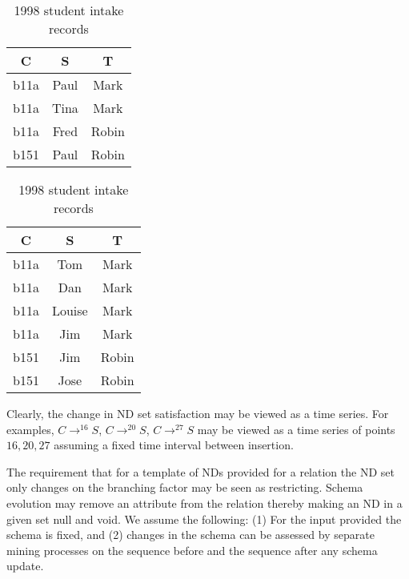 {\line
\begin{table}[ht]
\begin{minipage}[b]{8cm}
\begin{center}
\begin{tabular}{|c|c|c|} \hline
 C & S & T \\ \hline
 b11a & Paul & Mark \\ 
 b11a & Tina & Mark \\
 b11a & Fred & Robin \\
 b151 & Paul & Robin \\ \hline
\end{tabular}
\end{center}
\caption{\label{tab:1} 1997 student intake records}
\end{minipage}
\hfill
\begin{minipage}[b]{8cm}
\begin{center}
\begin{tabular}{|c|c|c|} \hline
 C & S & T \\ \hline
 b11a & Tom & Mark \\
 b11a & Dan & Mark \\
 b11a & Louise & Mark \\
 b11a & Jim & Mark \\
 b151 & Jim & Robin \\ 
 b151 & Jose & Robin \\ \hline
\end{tabular}
\end{center}
\caption{\label{tab:2} 1998 student intake records}
\end{minipage}
\end{table}
}


Clearly, the change in ND set satisfaction may be viewed as a
time series. For examples, $C \to^{16} S$, $C \to^{20} S$, $C \to^{27} S$ may
be viewed as a time series of points $16,20,27$ assuming a fixed time
interval between insertion.

\medskip

The requirement that for a template of NDs provided for a relation the
ND set only changes on the branching factor may be seen as
restricting. Schema evolution \cite{oe92,rod94} may remove an attribute from
the relation thereby making an ND in a given set null and void. We
assume the following: (1) For the input provided the schema is fixed,
and (2) changes in the schema can be assessed by separate mining
processes on the sequence before and the sequence after any schema update.


